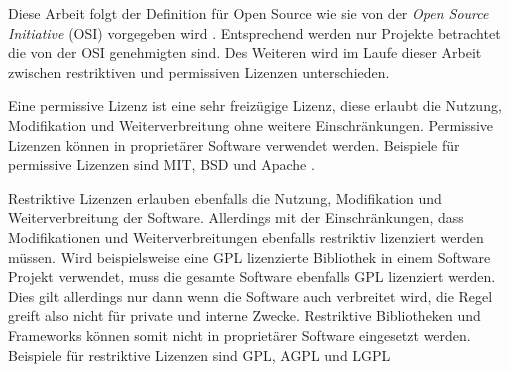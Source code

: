 Diese Arbeit folgt der Definition für Open Source wie sie von der \textit{Open Source Initiative}
(OSI) vorgegeben wird \cite{OpenSourceDefinition}. Entsprechend werden nur Projekte betrachtet die 
von der OSI genehmigten sind. Des Weiteren wird im Laufe dieser Arbeit zwischen restriktiven und 
permissiven Lizenzen unterschieden.

Eine permissive Lizenz ist eine sehr freizügige Lizenz, diese erlaubt die Nutzung, Modifikation
und Weiterverbreitung ohne weitere Einschränkungen. Permissive Lizenzen können in proprietärer
Software verwendet werden. Beispiele für permissive Lizenzen sind MIT, BSD und Apache 
\cite{OpenSourceDefinition}.

Restriktive Lizenzen erlauben ebenfalls die Nutzung, Modifikation und Weiterverbreitung der Software.
Allerdings mit der Einschränkungen, dass Modifikationen und Weiterverbreitungen ebenfalls restriktiv 
lizenziert werden müssen. Wird beispielsweise eine GPL lizenzierte Bibliothek in einem Software Projekt
verwendet, muss die gesamte Software ebenfalls GPL lizenziert werden. Dies gilt allerdings nur dann
wenn die Software auch verbreitet wird, die Regel greift also nicht für private und interne Zwecke. 
Restriktive Bibliotheken und Frameworks können somit nicht in proprietärer Software eingesetzt werden.
Beispiele für restriktive Lizenzen sind GPL, AGPL und LGPL \cite{OpenSourceDefinition}





\newpage
